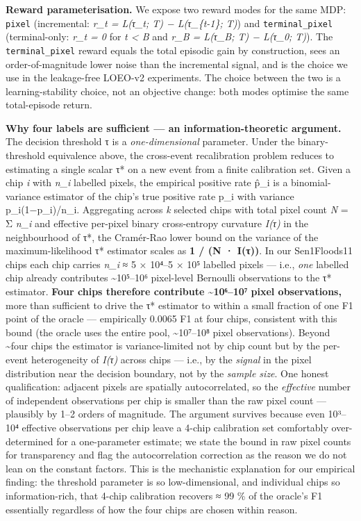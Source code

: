 \textbf{Reward parameterisation.} We expose two reward modes for the same MDP:
\texttt{pixel} (incremental: \emph{r\_t = L(τ\_t; T) − L(τ\_\{t-1\}; T)}) and
\texttt{terminal\_pixel} (terminal-only: \emph{r\_t = 0} for \emph{t \textless{} B} and
\emph{r\_B = L(τ\_B; T) − L(τ\_0; T)}). The \texttt{terminal\_pixel} reward equals the
total episodic gain by construction, sees an order-of-magnitude lower noise
than the incremental signal, and is the choice we use in the leakage-free
LOEO-v2 experiments. The choice between the two is a learning-stability
choice, not an objective change: both modes optimise the same total-episode
return.

\textbf{Why four labels are sufficient --- an information-theoretic argument.}
The decision threshold τ is a \emph{one-dimensional} parameter. Under the
binary-threshold equivalence above, the cross-event recalibration
problem reduces to estimating a single scalar τ* on a new event from a
finite calibration set. Given a chip \emph{i} with \emph{n\_i} labelled pixels,
the empirical positive rate p̂\_i is a binomial-variance estimator of
the chip's true positive rate p\_i with variance p\_i(1−p\_i)/n\_i.
Aggregating across \emph{k} selected chips with total pixel count \emph{N} = Σ
\emph{n\_i} and effective per-pixel binary cross-entropy curvature \emph{I(τ)} in
the neighbourhood of τ*, the Cramér-Rao lower bound on the variance of
the maximum-likelihood τ* estimator scales as \textbf{1 / (N · I(τ))}. In
our Sen1Floods11 chips each chip carries \emph{n\_i} ≈ 5 × 10⁴--5 × 10⁵
labelled pixels --- i.e., \emph{one} labelled chip already contributes
\textasciitilde10⁵--10⁶ pixel-level Bernoulli observations to the τ* estimator.
\textbf{Four chips therefore contribute \textasciitilde10⁶--10⁷ pixel observations,} more
than sufficient to drive the τ* estimator to within a small fraction
of one F1 point of the oracle --- empirically 0.0065 F1 at four chips,
consistent with this bound (the oracle uses the
entire pool, \textasciitilde10⁷--10⁸ pixel observations). Beyond \textasciitilde four chips the
estimator is variance-limited not by chip count but by the per-event
heterogeneity of \emph{I(τ)} across chips --- i.e., by the \emph{signal} in the
pixel distribution near the decision boundary, not by the \emph{sample
size}. One honest qualification: adjacent pixels are spatially
autocorrelated, so the \emph{effective} number of independent observations
per chip is smaller than the raw pixel count --- plausibly by 1--2 orders
of magnitude. The argument survives because even 10³--10⁴ effective
observations per chip leave a 4-chip calibration set comfortably
over-determined for a one-parameter estimate; we state the bound in
raw pixel counts for transparency and flag the autocorrelation
correction as the reason we do not lean on the constant factors.
This is the mechanistic explanation for our empirical finding:
the threshold parameter is so low-dimensional, and individual chips so
information-rich, that 4-chip calibration recovers ≈ 99 \% of the
oracle's F1 essentially regardless of how the four chips are chosen
within reason.

